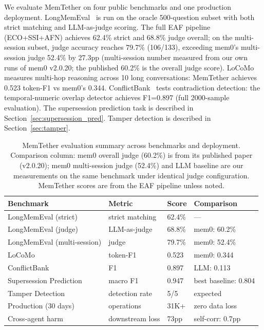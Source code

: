 \documentclass[11pt]{article}
\begin{document}
We evaluate MemTether on four public benchmarks and one production deployment. LongMemEval~\cite{wu2024longmemeval} is run on the oracle 500-question subset with both strict matching and LLM-as-judge scoring. The full EAF pipeline (ECO+SSI+AFN) achieves 62.4\% strict and 68.8\% judge overall; on the multi-session subset, judge accuracy reaches 79.7\% (106/133), exceeding mem0's multi-session judge 52.4\% by 27.3pp (multi-session number measured from our own runs of mem0 v2.0.20; the published 60.2\% is the overall judge score). LoCoMo~\cite{locomo} measures multi-hop reasoning across 10 long conversations: MemTether achieves 0.523 token-F1 vs mem0's 0.344. ConflictBank~\cite{conflictbank} tests contradiction detection: the temporal-numeric overlap detector achieves F1=0.897 (full 2000-sample evaluation). The supersession prediction task is described in Section~\ref{sec:supersession_pred}. Tamper detection is described in Section~\ref{sec:tamper}.
\label{sec:judge}

\begin{table}[h]
\centering
\caption{MemTether evaluation summary across benchmarks and deployment. Comparison column: mem0 overall judge (60.2\%) is from its published paper (v2.0.20); mem0 multi-session judge (52.4\%) and LLM baseline are our measurements on the same benchmark under identical judge configuration. MemTether scores are from the EAF pipeline unless noted.}
\begin{tabular}{llll}
\toprule
Benchmark & Metric & Score & Comparison \\
\midrule
LongMemEval (strict) & strict matching & 62.4\% & --- \\
LongMemEval (judge) & LLM-as-judge & 68.8\% & mem0: 60.2\% \\
LongMemEval (multi-session) & judge & 79.7\% & mem0: 52.4\% \\
LoCoMo & token-F1 & 0.523 & mem0: 0.344 \\
ConflictBank & F1 & 0.897 & LLM: 0.113 \\
Supersession Prediction & macro F1 & 0.947 & best baseline: 0.804 \\
Tamper Detection & detection rate & 5/5 & expected \\
Production (30 days) & operations & 31K+ & zero data loss \\
Cross-agent harm & downstream loss & 73pp & self-corr: 0.7pp \\
\bottomrule
\end{tabular}
\end{table}
\end{document}
